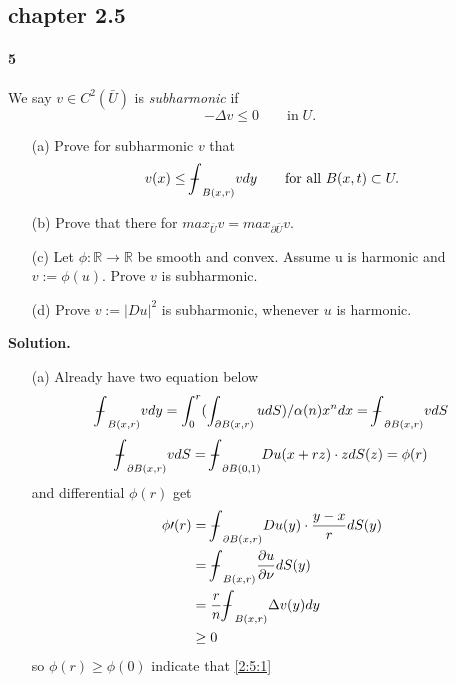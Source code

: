 \documentclass[a4paper]{book}
\newenvironment{solution}%
{\noindent\textbf{Solution.}}%
{\qedhere}
\newcommand\dbbint{{-\mkern -19mu\int}}
\numberwithin{equation}{chapter}
\theoremstyle{definition}
\begin{document}
\begin{multicols}{2}
\setlength{\columnseprule}{0.2pt}  

\section{chapter 2.5}
\paragraph{5}
We say $v \in C^2(\bar{U})$ is \textit{subharmonic} if 
\begin{equation} \label{2:5:1}
	-\Delta v \leq 0 \qquad \text{in} \; U.
\end{equation}
\begin{itemize}
	\item[(a)] Prove for subharmonic $v$ that 
	\begin{equation} \label{2:5:2} 
	v(x) \leq \dbbint_{B(x,r)} v dy \qquad \text{for all } B(x,t) \subset U.
	\end{equation}
	\item[(b)] Prove that there for $ max_{\bar{U}} v = max_{\partial\bar{U}} v. $
	\item[(c)] Let $\phi : \mathbb{R} \rightarrow \mathbb{R} $ be smooth and convex. Assume u is harmonic and $ v := \phi(u)$. Prove $v$ is subharmonic.
	\item[(d)] Prove $v := |Du|^2$ is subharmonic, whenever $u$ is harmonic.
\end{itemize}

\begin{solution}
	\begin{itemize}
		\item[(a)] Already have two equation below
		$$ \dbbint_{B(x,r)} v dy = \int_{0}^{r}(\int_{\partial B(x,r)} u dS) / \alpha (n) x^n dx = \dbbint_{\partial B(x,r)} v dS $$
		$$ \dbbint_{\partial B(x,r)} v dS = \dbbint_{\partial B(0,1)}Du(x + rz) \cdot z dS(z) = \phi (r) $$
		and differential $\phi(r)$ get 
		\begin{equation} 
		\begin{aligned} 
		 \phi \prime (r) &= \dbbint_{\partial B(x,r)} Du(y) \cdot \frac{y -x}{r} dS(y) \\
		&= \dbbint_{B(x,r)} \frac{\partial u}{\partial \nu} dS(y) \\
		&= \frac{r}{n} \dbbint_{B(x,r)} \Delta v(y) dy \\
		&\geq 0
		\end{aligned} 
		\end{equation} 
		so $\phi(r) \geq \phi(0) $ indicate that \ref{2:5:1}
		

\end{itemize}
\end{solution}
\end{multicols}
\end{document}

